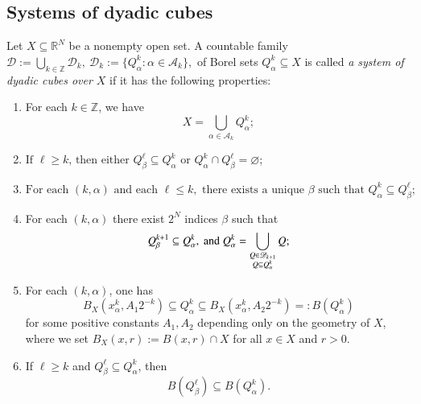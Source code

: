 \documentclass[12pt]{amsart}
\begin{document}
\subsection{Systems of dyadic cubes}


\begin{definition}\label{Defsystem}{\rm
Let $X\subseteq \mathbb{R}^N$ be a nonempty open set. A countable family
$
    \mathscr{D}
    := \bigcup_{k\in\mathbb{Z}}\mathscr{D}_{k}, \
    \mathscr{D}_{k}
    :=\{Q^k_{\alpha}\colon \alpha\in \mathscr{A}_k\},
$
of Borel sets $Q^k_{\alpha}\subseteq X$ is called \textit{a
system of dyadic cubes over  $X$}  if it has the following properties:

\begin{enumerate}
  \item[(i)] For each $k\in\mathbb{Z}$, we have $$    X
    = \bigcup_{\alpha\in \mathscr{A}_k} Q^k_{\alpha};$$\smallskip

  \item[(ii)] $\text{If }\ell\geq k\text{, then either }
        Q^{\ell}_{\beta}\subseteq Q^k_{\alpha}\text{ or }
        Q^k_{\alpha}\cap Q^{\ell}_{\beta}=\varnothing$;\smallskip

  \item[(iii)] $
    \text{For each }(k,\alpha)\text{ and each } \ell\leq k,
    \text{ there exists a unique } \beta
    \text{ such that }Q^{k}_{\alpha}\subseteq Q^\ell_{\beta};
$

\smallskip

\item[(iv)] For each $(k,\alpha)$ there exist $2^N$ indices $\beta$ such that
    $$ Q^{k+1}_{\beta}\subseteq Q^k_{\alpha},\ {\rm and}\
        Q^k_{\alpha} =\bigcup_{{\substack{Q\in\mathscr{D}_{k+1}\\ Q\subseteq Q^k_{\alpha}}}}Q;$$

\smallskip

\item[(v)] For each $(k,\alpha)$, one has $$B_X(x^k_{\alpha},A_1 2^{-k})
    \subseteq Q^k_{\alpha}\subseteq B_X(x^k_{\alpha},A_2 2^{-k})
    =: B(Q^k_{\alpha})$$
    for some positive constants $A_1,A_2$ depending only on the geometry of $X$, {where we set $B_X(x,r):=B(x,r)\cap X$ for all $x\in X$ and $r>0$.}

\smallskip

\item [(vi)]  If $\ell\geq k$ and
   $Q^{\ell}_{\beta}\subseteq Q^k_{\alpha}$, then
   $$B(Q^{\ell}_{\beta})\subseteq B(Q^k_{\alpha}).$$
\end{enumerate}



   }
\end{definition}
\end{document}
